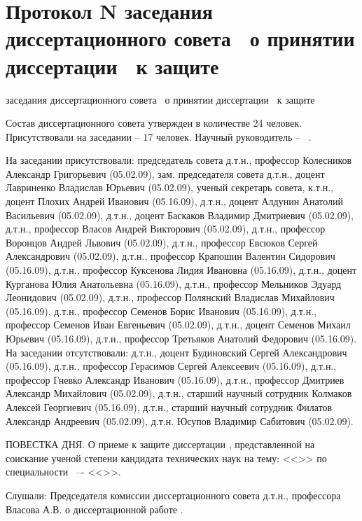 
\section{Протокол N заседания диссертационного совета \ о принятии диссертации \thesisAuthorLastNameFromFull\ к защите}

заседания диссертационного совета \
о принятии диссертации \thesisAuthorLastNameFromFull\ к защите 

Состав диссертационного совета утвержден в количестве 24 человек. Присутствовали на заседании – 17 человек.
Научный руководитель – \supervisorRegaliaShort\ \supervisorFioShort.

На заседании присутствовали: председатель совета д.т.н., профессор Колесников Александр Григорьевич (05.02.09), зам. председателя совета д.т.н., доцент Лавриненко Владислав Юрьевич (05.02.09), ученый секретарь совета, к.т.н., доцент Плохих Андрей Иванович (05.16.09), д.т.н., доцент Алдунин Анатолий Васильевич (05.02.09), д.т.н., доцент Баскаков Владимир Дмитриевич (05.02.09), д.т.н., профессор Власов Андрей Викторович (05.02.09), д.т.н., профессор Воронцов Андрей Львович (05.02.09), д.т.н., профессор Евсюков Сергей Александрович (05.02.09), д.т.н., профессор Крапошин Валентин Сидорович (05.16.09), д.т.н., профессор Куксенова Лидия Ивановна (05.16.09), д.т.н., доцент Курганова Юлия Анатольевна (05.16.09), д.т.н., профессор Мельников Эдуард Леонидович (05.02.09), д.т.н., профессор Полянский Владислав Михайлович (05.16.09), д.т.н., профессор Семенов Борис Иванович (05.16.09), д.т.н., профессор Семенов Иван Евгеньевич (05.02.09), д.т.н., доцент Семенов Михаил Юрьевич (05.16.09), д.т.н., профессор Третьяков Анатолий Федорович (05.16.09).
На заседании отсутствовали: д.т.н., доцент Будиновский Сергей Александрович (05.16.09), д.т.н., профессор Герасимов Сергей Алексеевич (05.16.09), д.т.н., профессор Гневко Александр Иванович (05.16.09), д.т.н., профессор Дмитриев Александр Михайлович (05.02.09), д.т.н., старший научный сотрудник Колмаков Алексей Георгиевич (05.16.09), д.т.н., старший научный сотрудник Филатов Александр Андреевич (05.02.09), д.т.н. Юсупов Владимир Сабитович (05.02.09).

ПОВЕСТКА ДНЯ.
О приеме к защите диссертации \thesisAuthorLastNameFromFull, представленной на соискание ученой степени кандидата технических наук на тему: <<\thesisTitle>> по специальности \thesisSpecialtyNumber\ –- <<\thesisSpecialtyTitle>>.

Слушали: 
Председателя комиссии диссертационного совета д.т.н., профессора Власова А.В.
о диссертационной работе \thesisAuthorLastNameFrom.

